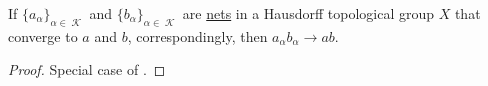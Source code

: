 \begin{proposition}\label{thm:limits_are_topological_group_homomorphisms}
  If \( \{ a_\alpha \}_{\alpha \in \mscrK} \) and \( \{ b_\alpha \}_{\alpha \in \mscrK} \) are \hyperref[def:topological_net]{nets} in a Hausdorff topological group \( X \) that converge to \( a \) and \( b \), correspondingly, then \( a_\alpha b_\alpha \to a b \).
\end{proposition}
\begin{proof}
  Special case of .
\end{proof}
